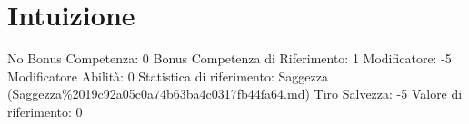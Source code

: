 \section{Intuizione}\label{intuizione}

\begin{description}
\tightlist
\item[Tags: ABI]
No Bonus Competenza: 0 Bonus Competenza di Riferimento: 1 Modificatore:
-5 Modificatore Abilità: 0 Statistica di riferimento: Saggezza
(Saggezza\%2019c92a05c0a74b63ba4c0317fb44fa64.md) Tiro Salvezza: -5
Valore di riferimento: 0
\end{description}
